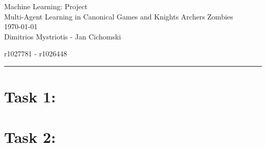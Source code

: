 \documentclass[12pt,letterpaper, onecolumn]{exam}
\begin{document}
\begingroup  
    \centering
    \LARGE Machine Learning: Project\\
    \LARGE Multi-Agent Learning in Canonical Games and Knights Archers Zombies\\[0.5em]
    \large \today\\[0.5em]
    \large Dimitrios Mystriotis - Jan Cichomski\par
    \large r1027781 - r1026448\par
\endgroup
\rule{\textwidth}{0.4pt}
\pointsdroppedatright   %
\printanswers
\renewcommand{\solutiontitle}{\noindent\textbf{Ans:}\enspace}   %

\section{\textbf{Task 1:}}

\section{\textbf{Task 2:}}
\end{document}
